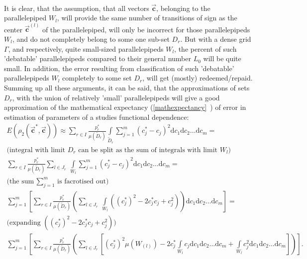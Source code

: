 \documentclass[11pt,a4paper]{article}
\numberwithin{equation}{subsection}
\newcommand{\vecc}{\vec{\textbf{c}}}
\begin{document}
\\
It is clear, that the assumption, that all vectors $\vecc$, belonging to the parallelepiped $W_{l}$, will provide the same number of transitions of sign as the center $\vecc^{(l)}$ of the parallelepiped, will only be incorrect for those parallelepipeds $W_{l}$, and do not completely belong to some one sub-set $D_{r}$. But with a dense grid $\Gamma$, and respectively, quite small-sized parallelepipeds $W_{l}$, the percent of such 'debatable' parallelepipeds compared to their general number $L_{0}$ will be quite small. In addition, the error resulting from classification of such 'debatable' parallelepipeds $W_{l}$ completely to some set $D_{r}$, will get (mostly) redeemed/repaid. Summing up all these arguments, it can be said, that the approximations of sets $D_{r}$, with the union of relatively 'small' parallelepipeds will give a good  approximation of the mathematical expectancy (\vref{mathexpectancy}~) of error in estimation of parameters of a studies functional dependence:
\begin{gather}
\nonumber
E(\rho_{2}(\vecc^{*},\vecc)) \approx \sum\limits_{r \in I} \frac{p_{r}^{*}}{\mu(\tilde{D}_{r})} \int\limits_{\tilde{D}_{r}} \sum\limits_{j=1}^{m}(c_{j}^{*}-c_{j})^{2}\mathrm{d}c_{1}\mathrm{d}c_{2}\dots \mathrm{d}c_{m} = \\
\nonumber 
\text{(integral with limit } D_{r} \text{ can be split as the sum of integrals with limit } W_{l} \text{)}\\
\sum\limits_{r \in I} \frac{p_{r}^{*}}{\mu(\tilde{D}_{r})} \sum\limits_{l \in J_{r}} \  \int\limits_{W_{l}} \sum\limits_{j=1}^{m}(c_{j}^{*}-c_{j})^{2}\mathrm{d}c_{1}\mathrm{d}c_{2}\dots \mathrm{d}c_{m} = \\
\nonumber
\text{(the sum } \sum_{j=1}^{m} \text{ is facrotised out)} \\
\nonumber
\sum\limits_{j=1}^{m}  \left[ \sum\limits_{r \in I} \frac{p_{r}^{*}}{\mu(\tilde{D}_{r})} \left( \sum\limits_{l \in J_{r}} \ \int\limits_{W_{l}} ((c_{j}^{*})^{2}-2c_{j}^{*}c_{j}+c_{j}^{2}) \right) \mathrm{d}c_{1}\mathrm{d}c_{2}\dots \mathrm{d}c_{m} \right] = \\
\nonumber
\text{(expanding } ((c_{j}^{*})^{2}-2c_{j}^{*}c_{j}+c_{j}^{2}) \text{)}\\
\sum\limits_{j=1}^{m}  \left[ \sum\limits_{r \in I} \frac{p_{r}^{*}}{\mu(\tilde{D}_{r})} \left( \sum\limits_{l \in J_{r}} \left[ (c_{j}^{*})^{2} \mu(W_{(l)}) - 2c_{j}^{*} \int\limits_{W_{l}} c_{j} \mathrm{d}c_{1}\mathrm{d}c_{2}\dots \mathrm{d}c_{m} + \int\limits_{W_{l}} c_{j}^{2} \mathrm{d}c_{1}\mathrm{d}c_{2}\dots \mathrm{d}c_{m} \right] \right) \right]. \label{eq-simplification-chain}
\end{gather}
\end{document}
